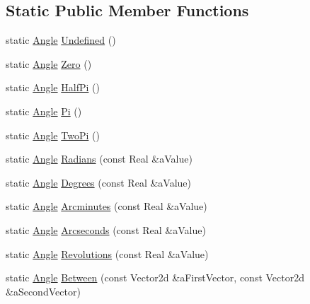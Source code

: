 \subsection*{Static Public Member Functions}
\begin{DoxyCompactItemize}
\item 
static \hyperlink{classostk_1_1physics_1_1units_1_1_angle}{Angle} \hyperlink{classostk_1_1physics_1_1units_1_1_angle_abfde70c3cfb9fa966ee91d498092766a}{Undefined} ()
\item 
static \hyperlink{classostk_1_1physics_1_1units_1_1_angle}{Angle} \hyperlink{classostk_1_1physics_1_1units_1_1_angle_a4454975f87e5d3532cf8b819819207e7}{Zero} ()
\item 
static \hyperlink{classostk_1_1physics_1_1units_1_1_angle}{Angle} \hyperlink{classostk_1_1physics_1_1units_1_1_angle_a6065318d10aee4f99d28af429a64d9bb}{Half\+Pi} ()
\item 
static \hyperlink{classostk_1_1physics_1_1units_1_1_angle}{Angle} \hyperlink{classostk_1_1physics_1_1units_1_1_angle_ad207d164950a07ee779a199d5c4765c1}{Pi} ()
\item 
static \hyperlink{classostk_1_1physics_1_1units_1_1_angle}{Angle} \hyperlink{classostk_1_1physics_1_1units_1_1_angle_a2a78cc568975aa82e2011e24cd015f72}{Two\+Pi} ()
\item 
static \hyperlink{classostk_1_1physics_1_1units_1_1_angle}{Angle} \hyperlink{classostk_1_1physics_1_1units_1_1_angle_aceb137f392490d9b1d1de90406e62c9c}{Radians} (const Real \&a\+Value)
\item 
static \hyperlink{classostk_1_1physics_1_1units_1_1_angle}{Angle} \hyperlink{classostk_1_1physics_1_1units_1_1_angle_a6cddbceb5fd1f0c2a6dd29dae047baee}{Degrees} (const Real \&a\+Value)
\item 
static \hyperlink{classostk_1_1physics_1_1units_1_1_angle}{Angle} \hyperlink{classostk_1_1physics_1_1units_1_1_angle_a1cd6da5abf0593c2c3f3b4908c3c7008}{Arcminutes} (const Real \&a\+Value)
\item 
static \hyperlink{classostk_1_1physics_1_1units_1_1_angle}{Angle} \hyperlink{classostk_1_1physics_1_1units_1_1_angle_ac5817629ffd63aa9df93f0ee8b61af3a}{Arcseconds} (const Real \&a\+Value)
\item 
static \hyperlink{classostk_1_1physics_1_1units_1_1_angle}{Angle} \hyperlink{classostk_1_1physics_1_1units_1_1_angle_a827dcc99310b0b0117cf5d7dd5b4c899}{Revolutions} (const Real \&a\+Value)
\item 
static \hyperlink{classostk_1_1physics_1_1units_1_1_angle}{Angle} \hyperlink{classostk_1_1physics_1_1units_1_1_angle_a49c63c044fe667b0c210c6cd5b881380}{Between} (const Vector2d \&a\+First\+Vector, const Vector2d \&a\+Second\+Vector)

\end{DoxyCompactItemize}
